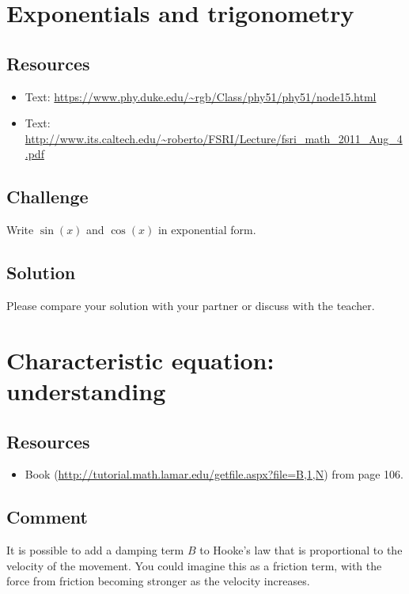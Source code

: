 



\newpage
\section{Exponentials and trigonometry}

\subsection*{Resources}
\begin{itemize}
    \item Text: \url{https://www.phy.duke.edu/~rgb/Class/phy51/phy51/node15.html}
    \item Text: \url{http://www.its.caltech.edu/~roberto/FSRI/Lecture/fsri_math_2011_Aug_4.pdf}
\end{itemize}

\subsection*{Challenge}
Write $\sin(x)$ and $\cos(x)$ in exponential form.

\subsection*{Solution}
Please compare your solution with your partner or discuss with the teacher.




\newpage
\section{Characteristic equation: understanding}

\subsection*{Resources}
\begin{itemize}
    \item Book (\url{http://tutorial.math.lamar.edu/getfile.aspx?file=B,1,N}) from page 106.
\end{itemize}

\subsection*{Comment}
It is possible to add a damping term $B$ to Hooke's law that is proportional to the velocity of the movement. You could imagine this as a friction term, with the force from friction becoming stronger as the velocity increases.

